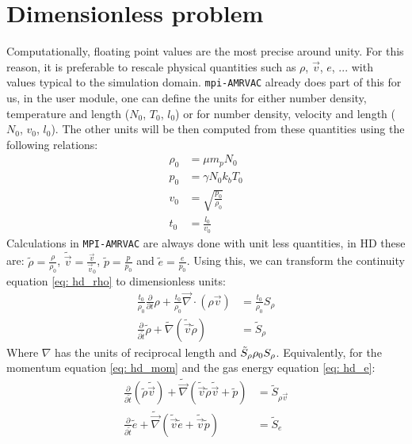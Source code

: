 \section{Dimensionless problem}
Computationally, floating point values are the most precise around unity. For this reason, it is preferable to rescale physical quantities such as $\rho$, $\vec{v}$, $e$, ... with values typical to the simulation domain. \texttt{mpi-AMRVAC} already does part of this for us, in the user module, one can define the units for either number density, temperature  and length ($N_0$, $T_0$, $l_0$) or for number density, velocity  and length ($N_0$, $v_0$, $l_0$). The other units will be then computed from these quantities using the following relations:
\begin{align}
\rho_0 &= \mu m_p N_0 \\
   p_0 &= \gamma N_0 k_b T_0 \\
   v_0 &= \sqrt{\frac{p_0}{\rho_0}} \\
   t_0 &= \frac{l_0}{v_0}
\end{align}
Calculations in \texttt{MPI-AMRVAC} are always done with unit less quantities, in HD these are: $\tilde{\rho} = \frac{\rho}{\rho_0}$, $\tilde{\vec{v}} = \frac{\vec{v}}{\vec{v}_0}$, $\tilde{p} = \frac{p}{p_0}$ and $\tilde{e} = \frac{e}{p_0}$. Using this, we can transform the continuity equation \eqref{eq: hd_rho} to dimensionless units:
\begin{align}
\frac{t_0}{\rho_0} \frac{\partial}{\partial t} \rho  + \frac{t_0}{\rho_0} \vec{\nabla} \cdot \left( \rho \vec{v}  \right) &= \frac{t_0}{\rho_0} S_\rho \\
\frac{\partial}{\partial \tilde{t}} \tilde{\rho} + \tilde{\nabla} \left( \tilde{\vec{v}} \tilde{\rho} \right) &= \tilde{S}_\rho
\end{align}
Where $\nabla$ has the units of reciprocal length and $\tilde{S}_\rho \def \frac{t_0}{\rho_0} S_\rho$. Equivalently, for the momentum equation \eqref{eq: hd_mom} and the gas energy equation \eqref{eq: hd_e}:
\begin{align}
\frac{\partial}{\partial \tilde{t}} \left(\tilde{\rho} \tilde{\vec{v}} \right) + \tilde{\vec{\nabla}} \left(\tilde{\vec{v}} \tilde{\rho}  \tilde{\vec{v}} + \tilde{p} \right) &= \tilde{S}_{\rho \vec{v}} \\
\frac{\partial}{\partial \tilde{t}} \tilde{e} + \tilde{\vec{\nabla}} \left(\tilde{\vec{v}} \tilde{e} + \tilde{\vec{v}} \tilde{p} \right) &= \tilde{S}_e \\
\end{align}
